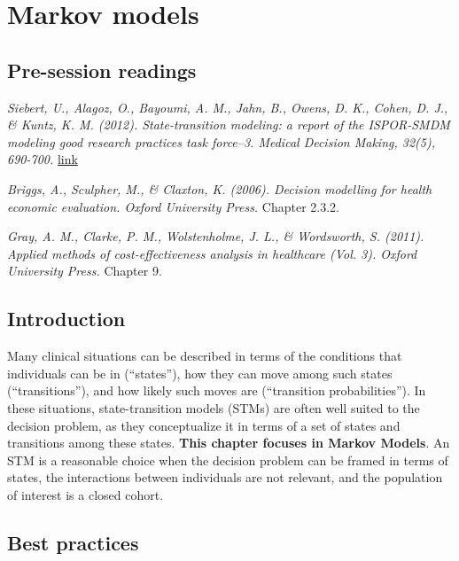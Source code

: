 \documentclass[
]{book}
\begin{document}
\hypertarget{markov}{%
\chapter{Markov models}\label{markov}}

\hypertarget{pre-session-readings-3}{%
\section{Pre-session readings}\label{pre-session-readings-3}}

\emph{Siebert, U., Alagoz, O., Bayoumi, A. M., Jahn, B., Owens, D. K., Cohen, D. J., \& Kuntz, K. M. (2012). State-transition modeling: a report of the ISPOR-SMDM modeling good research practices task force--3. Medical Decision Making, 32(5), 690-700.} \href{https://www.valueinhealthjournal.com/action/showPdf?pii=S1098-3015\%2812\%2901654-3}{link}

\emph{Briggs, A., Sculpher, M., \& Claxton, K. (2006). Decision modelling for health economic evaluation. Oxford University Press.} Chapter 2.3.2.

\emph{Gray, A. M., Clarke, P. M., Wolstenholme, J. L., \& Wordsworth, S. (2011). Applied methods of cost-effectiveness analysis in healthcare (Vol. 3). Oxford University Press.} Chapter 9.

\hypertarget{introduction-1}{%
\section{Introduction}\label{introduction-1}}

Many clinical situations can be described in terms of the conditions that individuals can be in (``states''), how they can move among such states (``transitions''), and how likely such moves are (``transition probabilities''). In these situations, state-transition models (STMs) are often well suited to the decision problem, as they conceptualize it in terms of a set of states and transitions among these states. \textbf{This chapter focuses in Markov Models}. An STM is a reasonable choice when the decision problem can be framed in terms of states, the interactions between individuals are not relevant, and the population of interest is a closed cohort.

\hypertarget{best-practices}{%
\section{Best practices}\label{best-practices}}
\end{document}
